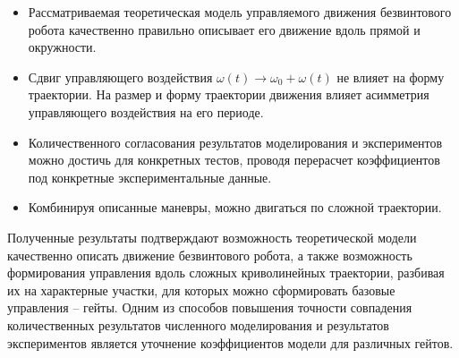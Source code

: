 \begin{itemize}
	\item Рассматриваемая теоретическая модель управляемого движения безвинтового робота качественно правильно  описывает его движение вдоль прямой и окружности. %
	
	\item Сдвиг управляющего воздействия $\omega(t) \rightarrow \omega_0 + \omega(t)$ не влияет на форму траектории. На размер и форму траектории движения влияет асимметрия управляющего воздействия на его периоде.
	
	\item Количественного согласования результатов моделирования и экспериментов можно достичь для конкретных тестов, проводя перерасчет коэффициентов под конкретные экспериментальные данные.
	
	\item Комбинируя описанные маневры, можно двигаться по сложной траектории.
	
	
\end{itemize}



Полученные результаты подтверждают возможность теоретической модели качественно описать движение безвинтового робота, а также возможность формирования управления вдоль сложных криволинейных траектории, разбивая их на характерные участки, для которых можно сформировать базовые управления -- гейты. Одним из способов повышения точности совпадения количественных результатов численного моделирования и результатов экспериментов является уточнение коэффициентов модели для различных гейтов.

